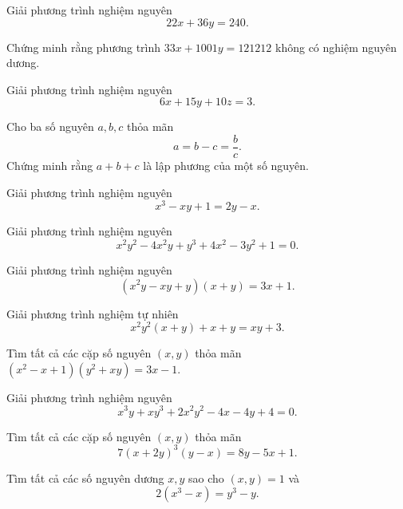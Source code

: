 \begin{btt}
Giải phương trình nghiệm nguyên $$22x+36y=240.$$
\end{btt}

\begin{btt}
Chứng minh rằng phương trình $33x+1001y=121212$ không có nghiệm nguyên dương.
\end{btt}

\begin{btt}
Giải phương trình nghiệm nguyên $$6x+15y+10z=3.$$
\end{btt}

\begin{btt}
Cho ba số nguyên $a,b,c$ thỏa mãn $$a=b-c=\dfrac{b}{c}.$$ Chứng minh rằng $a+b+c$ là lập phương của một số nguyên.
\end{btt}

\begin{btt}
Giải phương trình nghiệm nguyên $$x^3-xy+1=2y-x.$$
\end{btt}

\begin{btt}
Giải phương trình nghiệm nguyên $$x^2y^2-4x^2y+y^3+4x^2-3y^2+1=0.$$
\end{btt}

\begin{btt}
Giải phương trình nghiệm nguyên $$\left(x^2y-xy+y\right)(x+y)=3x+1.$$
\end{btt}

\begin{btt}
Giải phương trình nghiệm tự nhiên
\[x^2y^2(x+y)+x+y=xy+3.\]
\end{btt}

\begin{btt}
Tìm tất cả các cặp số nguyên $\left( {x,y} \right)$ thỏa mãn $\left( {{x^2} - x + 1} \right)\left( {{y^2} + xy} \right) = 3x - 1$.
\end{btt}

\begin{btt}
Giải phương trình nghiệm nguyên
\[x^3y+xy^3+2x^2y^2-4x-4y+4=0.\]
\end{btt}

\begin{btt}
Tìm tất cả các cặp số nguyên $(x,y)$ thỏa mãn
$$7(x+2y)^3(y-x)=8y-5x+1.$$
\end{btt}

\begin{btt}
Tìm tất cả các số nguyên dương \(x,y\) sao cho $(x,y)=1$ và \[2\left ( x^3-x \right )=y^3-y.\]
\end{btt}

